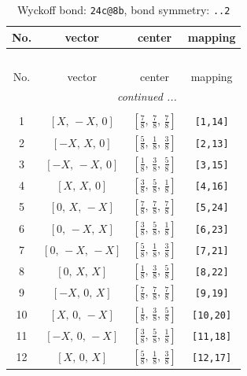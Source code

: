 \documentclass[fleqn,8pt]{jsarticle}
\begin{document}
\renewcommand{\arraystretch}{1.2}
\begin{longtable}{cccc}
\caption{Wyckoff bond: {\tt 24c@8b}, bond symmetry: {\tt ..2}}
 \\
 \hline \hline
No. & vector & center & mapping \\ \hline \endfirsthead

\multicolumn{3}{l}{\tablename\ \thetable{}} \\
 \hline \hline
No. & vector & center & mapping \\ \hline \endhead

 \hline \hline
\multicolumn{3}{r}{\footnotesize\it continued ...} \\ \endfoot

 \hline \hline
\multicolumn{3}{r}{} \\ \endlastfoot

1 & $\left[ X,\, - X,\, 0 \right]$ & $\left[ \frac{7}{8},\, \frac{7}{8},\, \frac{7}{8} \right]$ & {\tt [1,14]} \\ \hline
2 & $\left[ - X,\, X,\, 0 \right]$ & $\left[ \frac{5}{8},\, \frac{1}{8},\, \frac{3}{8} \right]$ & {\tt [2,13]} \\ \hline
3 & $\left[ - X,\, - X,\, 0 \right]$ & $\left[ \frac{1}{8},\, \frac{3}{8},\, \frac{5}{8} \right]$ & {\tt [3,15]} \\ \hline
4 & $\left[ X,\, X,\, 0 \right]$ & $\left[ \frac{3}{8},\, \frac{5}{8},\, \frac{1}{8} \right]$ & {\tt [4,16]} \\ \hline
5 & $\left[ 0,\, X,\, - X \right]$ & $\left[ \frac{7}{8},\, \frac{7}{8},\, \frac{7}{8} \right]$ & {\tt [5,24]} \\ \hline
6 & $\left[ 0,\, - X,\, X \right]$ & $\left[ \frac{3}{8},\, \frac{5}{8},\, \frac{1}{8} \right]$ & {\tt [6,23]} \\ \hline
7 & $\left[ 0,\, - X,\, - X \right]$ & $\left[ \frac{5}{8},\, \frac{1}{8},\, \frac{3}{8} \right]$ & {\tt [7,21]} \\ \hline
8 & $\left[ 0,\, X,\, X \right]$ & $\left[ \frac{1}{8},\, \frac{3}{8},\, \frac{5}{8} \right]$ & {\tt [8,22]} \\ \hline
9 & $\left[ - X,\, 0,\, X \right]$ & $\left[ \frac{7}{8},\, \frac{7}{8},\, \frac{7}{8} \right]$ & {\tt [9,19]} \\ \hline
10 & $\left[ X,\, 0,\, - X \right]$ & $\left[ \frac{1}{8},\, \frac{3}{8},\, \frac{5}{8} \right]$ & {\tt [10,20]} \\ \hline
11 & $\left[ - X,\, 0,\, - X \right]$ & $\left[ \frac{3}{8},\, \frac{5}{8},\, \frac{1}{8} \right]$ & {\tt [11,18]} \\ \hline
12 & $\left[ X,\, 0,\, X \right]$ & $\left[ \frac{5}{8},\, \frac{1}{8},\, \frac{3}{8} \right]$ & {\tt [12,17]} \\
\end{longtable}
\end{document}
